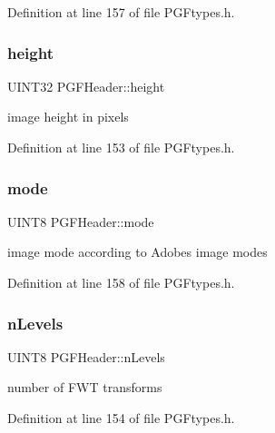 Definition at line 157 of file P\+G\+Ftypes.\+h.

\mbox{\label{structPGFHeader_a7262335e99ca409759e1aa8c0f0164b1}} 
\subsubsection{\texorpdfstring{height}{height}}
{\footnotesize\ttfamily U\+I\+N\+T32 P\+G\+F\+Header\+::height}



image height in pixels 



Definition at line 153 of file P\+G\+Ftypes.\+h.

\mbox{\label{structPGFHeader_a3ddaf075db8ee812ad688d9ed39e0698}} 
\subsubsection{\texorpdfstring{mode}{mode}}
{\footnotesize\ttfamily U\+I\+N\+T8 P\+G\+F\+Header\+::mode}



image mode according to Adobe\textquotesingle{}s image modes 



Definition at line 158 of file P\+G\+Ftypes.\+h.

\mbox{\label{structPGFHeader_a963890fa1e02a517923f9d0bf0d7e9eb}} 
\subsubsection{\texorpdfstring{nLevels}{nLevels}}
{\footnotesize\ttfamily U\+I\+N\+T8 P\+G\+F\+Header\+::n\+Levels}



number of F\+WT transforms 



Definition at line 154 of file P\+G\+Ftypes.\+h.

\mbox{\label{structPGFHeader_ac314a16d5984aea88f4a5ff38f49c08b}} 
